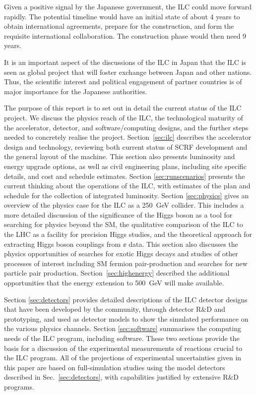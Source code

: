 Given a positive signal by the Japanese government, the ILC could move 
forward rapidly.
The potential timeline would have an initial state of 
about 4 years to obtain
 international agreements, prepare for the  construction, and form 
 the requisite international
collaboration.  The construction phase would then need 9 years.


It is an important aspect of the discussions of the ILC in Japan that the
ILC is seen as global project that will foster exchange between Japan
and other nations.   Thus, the  
scientific interest and political engagement of partner countries is of
major importance
for the Japanese authorities.  

The purpose of this report is to set out in detail the current status
of the ILC project.  We discuss 
the physics reach of the ILC, the technological maturity of the accelerator,
detector, and software/computing designs,
and the further steps 
 needed to concretely realise the project.  Section~\ref{sec:ilc}
 describes the accelerator design and technology, reviewing both 
 current status of SCRF development and the general layout of the
 machine.  This section also presents luminosity and energy upgrade
 options,  as well as civil engineering plans, including site
 specific details, and cost and schedule estimates.
 Section \ref{sec:runscenarios}  presents the current
 thinking about the operations of the ILC, with estimates of the plan
 and schedule for the 
 collection of integrated luminosity.
 Section \ref{sec:physics} gives an overview of the physics case for
 the ILC as a 250~GeV collider.
 This includes a more detailed discussion of the significance of the Higgs boson 
 as a tool for searching for physics beyond the SM, the qualitative
 comparison of the ILC to the LHC as a facility for precision Higgs
 studies, and the theoretical approach for extracting Higgs boson
 couplings from $\ee$ data.  This section also discusses the physics
 opportunities of searches for exotic Higgs decays and studies of
 other processes of interest including SM fermion pair-production and
 searches for
 new particle pair production. Section~\ref{sec:highenergy} described
 the additional opportunities that the energy extension to 500~GeV
 will make available. 
 
 Section \ref{sec:detectors}
 provides detailed descriptions of the ILC detector designs
 that have been developed by the community,
 through detector R\&D and prototyping, and used as detector
 models to show the simulated performance on the various
 physics channels. Section \ref{sec:software}
 summarises the computing needs of the ILC program,
 including software.  These two sections provide the basis for a
 discussion of the experimental measurements of reactions crucial to
 the ILC program. All of the projections of experimental
 uncertainties given in this paper are based on full-simulation
 studies using the model detectors described in
 Sec.~\ref{sec:detectors},
 with capabilities justified by
 extensive R\&D programs. 

